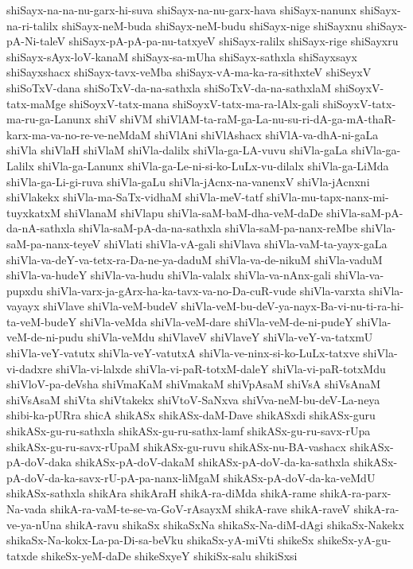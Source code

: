 {shiSayx-na-na-nu-garx-hi-suva
shiSayx-na-nu-garx-hava
shiSayx-nanunx
shiSayx-na-ri-talilx
shiSayx-neM-buda
shiSayx-neM-budu
shiSayx-nige
shiSayxnu
shiSayx-pA-Ni-taleV
shiSayx-pA-pA-pa-nu-tatxyeV
shiSayx-ralilx
shiSayx-rige
shiSayxru
shiSayx-sAyx-loV-kanaM
shiSayx-sa-mUha
shiSayx-sathxla
shiSayxsayx
shiSayxshacx
shiSayx-tavx-veMba
shiSayx-vA-ma-ka-ra-sithxteV
shiSeyxV
shiSoTxV-dana
shiSoTxV-da-na-sathxla
shiSoTxV-da-na-sathxlaM
shiSoyxV-tatx-maMge
shiSoyxV-tatx-mana
shiSoyxV-tatx-ma-ra-lAlx-gali
shiSoyxV-tatx-ma-ru-ga-Lanunx
shiV
shiVM
shiVlAM-ta-raM-ga-La-nu-su-ri-dA-ga-mA-thaR-karx-ma-va-no-re-ve-neMdaM
shiVlAni
shiVlAshacx
shiVlA-va-dhA-ni-gaLa
shiVla
shiVlaH
shiVlaM
shiVla-dalilx
shiVla-ga-LA-vuvu
shiVla-gaLa
shiVla-ga-Lalilx
shiVla-ga-Lanunx
shiVla-ga-Le-ni-si-ko-LuLx-vu-dilalx
shiVla-ga-LiMda
shiVla-ga-Li-gi-ruva
shiVla-gaLu
shiVla-jAcnx-na-vanenxV
shiVla-jAcnxni
shiVlakekx
shiVla-ma-SaTx-vidhaM
shiVla-meV-tatf
shiVla-mu-tapx-nanx-mi-tuyxkatxM
shiVlanaM
shiVlapu
shiVla-saM-baM-dha-veM-daDe
shiVla-saM-pA-da-nA-sathxla
shiVla-saM-pA-da-na-sathxla
shiVla-saM-pa-nanx-reMbe
shiVla-saM-pa-nanx-teyeV
shiVlati
shiVla-vA-gali
shiVlava
shiVla-vaM-ta-yayx-gaLa
shiVla-va-deY-va-tetx-ra-Da-ne-ya-daduM
shiVla-va-de-nikuM
shiVla-vaduM
shiVla-va-hudeY
shiVla-va-hudu
shiVla-valalx
shiVla-va-nAnx-gali
shiVla-va-pupxdu
shiVla-varx-ja-gArx-ha-ka-tavx-va-no-Da-cuR-vude
shiVla-varxta
shiVla-vayayx
shiVlave
shiVla-veM-budeV
shiVla-veM-bu-deV-ya-nayx-Ba-vi-nu-ti-ra-hi-ta-veM-budeY
shiVla-veMda
shiVla-veM-dare
shiVla-veM-de-ni-pudeY
shiVla-veM-de-ni-pudu
shiVla-veMdu
shiVlaveV
shiVlaveY
shiVla-veY-va-tatxmU
shiVla-veY-vatutx
shiVla-veY-vatutxA
shiVla-ve-ninx-si-ko-LuLx-tatxve
shiVla-vi-dadxre
shiVla-vi-lalxde
shiVla-vi-paR-totxM-daleY
shiVla-vi-paR-totxMdu
shiVloV-pa-deVsha
shiVmaKaM
shiVmakaM
shiVpAsaM
shiVsA
shiVsAnaM
shiVsAsaM
shiVta
shiVtakekx
shiVtoV-SaNxva
shiVva-neM-bu-deV-La-neya
shibi-ka-pURra
shicA
shikASx
shikASx-daM-Dave
shikASxdi
shikASx-guru
shikASx-gu-ru-sathxla
shikASx-gu-ru-sathx-lamf
shikASx-gu-ru-savx-rUpa
shikASx-gu-ru-savx-rUpaM
shikASx-gu-ruvu
shikASx-nu-BA-vashacx
shikASx-pA-doV-daka
shikASx-pA-doV-dakaM
shikASx-pA-doV-da-ka-sathxla
shikASx-pA-doV-da-ka-savx-rU-pA-pa-nanx-liMgaM
shikASx-pA-doV-da-ka-veMdU
shikASx-sathxla
shikAra
shikAraH
shikA-ra-diMda
shikA-rame
shikA-ra-parx-Na-vada
shikA-ra-vaM-te-se-va-GoV-rAsayxM
shikA-rave
shikA-raveV
shikA-ra-ve-ya-nUna
shikA-ravu
shikaSx
shikaSxNa
shikaSx-Na-diM-dAgi
shikaSx-Nakekx
shikaSx-Na-kokx-La-pa-Di-sa-beVku
shikaSx-yA-miVti
shikeSx
shikeSx-yA-gu-tatxde
shikeSx-yeM-daDe
shikeSxyeY
shikiSx-salu
shikiSxsi
}
